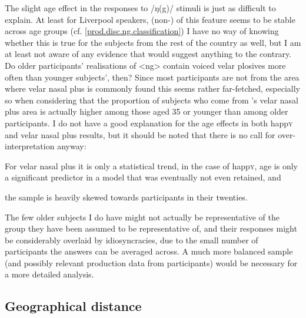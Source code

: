 The slight age effect in the responses to /ŋ(g)/ stimuli is just as difficult to explain.
At least for Liverpool speakers, (non-) of this feature seems to be stable across age groups (cf. \ref{prod.disc.ng.classification})
I have no way of knowing whether this is true for the subjects from the rest of the country as well, but I am at least not aware of any evidence that would suggest anything to the contrary.
Do older participants' realisations of <ng> contain voiced velar plosives more often than younger subjects', then?
Since most participants are not from the area where velar nasal plus is commonly found this seems rather far-fetched, especially so when considering that the proportion of subjects who come from \citeauthor{trudgill1999}'s \citeyear{trudgill1999} velar nasal plus area is actually higher among those aged 35 or younger than among older participants.
I do not have a good explanation for the age effects in both happ\textsc{y} and velar nasal plus results, but it should be noted that there is no call for over-interpretation anyway:
	\begin{inparaenum}[(a)]
		\item For velar nasal plus it is only a statistical trend, in the case of happ\textsc{y}, age is only a significant predictor in a model that was eventually not even retained, and
		\item the sample is heavily skewed towards participants in their twenties.
	\end{inparaenum}
The few older subjects I do have might not actually be representative of the group they have been assumed to be representative of, and their responses might be considerably overlaid by idiosyncracies, due to the small number of participants the answers can be averaged across.
A much more balanced sample (and possibly relevant production data from participants) would be necessary for a more detailed analysis.

		\subsection{Geographical distance}

